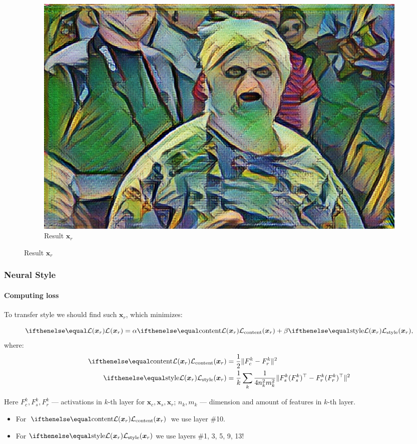 \documentclass[10pt]{beamer}
\begin{document}
\begin{frame}
\begin{figure}
\begin{subfigure}[b]{0.3\textwidth}
        \includegraphics[width=\textwidth]{images/granny-muse-result}
        \caption{Result $\bm x_r$}
    \end{subfigure}
\end{figure}    
\end{frame}


\begin{frame}
\frametitle{Neural Style}
\framesubtitle{Computing loss}
To transfer style we should find such $\bm x_r$, which minimizes:

\[
\loss{\bm x_r} = \alpha \loss[\text{content}]{\bm x_r} + \beta \loss[\text{style}]{\bm x_r},
\]
where:
\begin{equation*}
\begin{split}
\loss[\text{content}]{\bm x_r} & = \frac{1}{2}\Vert F_c^k - F_r^k \Vert^2 \\
\loss[\text{style}]{\bm x_r} & = \frac{1}{k}\sum_{k} \frac{1}{4 n_k^2 m_k^2} \Vert F_s^k (F_s^k)^\top - F_r^k (F_r^k)^\top \Vert^2 \\
\end{split}
\end{equation*}

Here $F_c^k, F_s^k, F_r^k$ --- activations in $k$-th layer for $\bm x_c, \bm x_s, \bm x_r$; $n_k, m_k$ --- dimension and amount of features in $k$-th layer.
\begin{itemize}
    \item For $\loss[\text{content}]{\bm x_r}$ we use layer \#10.
    \item For $\loss[\text{style}]{\bm x_r}$ we use layers \#1, 3, 5, 9, 13!
\end{itemize}

\end{frame}
\end{document}
